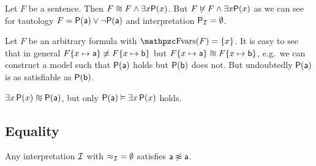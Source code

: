 \begin{example}
	Let \( F \) be a sentence.
	Then \( F \equisat F \land \exists x \mP(x) \).
	But \( F \not\vDash F \land \exists x \mathsf{P}(x) \)
	as we can see for tautology \( F = \mathsf{P}(\mathsf{a})\lor\lnot\mathsf{P}(\mathsf{a}) \)
	and interpretation \( \mathsf{P}_{\mathcal{I}} = \emptyset \).
\end{example}



\begin{example}
	Let \(F\) be an arbitrary formula with \( \fvar(F) = \{ x \} \).
	It is easy to see that in general
	\( F\{ x\mapsto\mathsf{a} \} \not\equiv F\{ x\mapsto\mathsf{b} \} \)
	but
	\( F\{ x\mapsto\ma \} \equisat F\{ x\mapsto\mb \} \),
	e.g.~we can construct a model such that
	\(\mathsf{P}(\mathsf{a})\) holds but \(\mathsf{P}(\mathsf{b})\) does not.
	But undoubtedly \(\mathsf{P}(\mathsf{a})\) is as satisfiable as
	 \(\mathsf{P}(\mathsf{b})\).
\end{example}

\begin{example}
	\( \exists x \, \mP(x) \equisat \mP(\ma) \), but only
	\( \mathsf{P}(\mathsf{a}) \vDash \exists x \, \mathsf{P}(x) \) holds.
\end{example}



\subsection{Equality}

\begin{example}\label{ex:a:neq:a}
	Any interpretation \( \mathcal{I} \)
	with \( {\approx_{\mathcal{I}}} = \emptyset \) satisfies \( \mathsf{a}\not\approx\mathsf{a} \).
\end{example}


